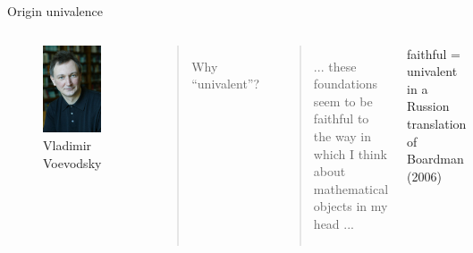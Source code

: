 \documentclass[english,draft]{beamer}
\begin{document}
\begin{frame}{Origin univalence}

\begin{columns}[c]
        \begin{center}
            \begin{figure}[h!]
                \includegraphics[height=.7\textheight]{figures/voevodsky.jpg}
                \caption{Vladimir Voevodsky}
            \end{figure} 
        \end{center}
        \begin{quotation}
            Why ``univalent''?
        \end{quotation}

        \pause

        \begin{quotation}
        ... these foundations seem to be faithful to the way in which I think about mathematical objects in my head ...
        \end{quotation}

        faithful = univalent in a Russion translation of Boardman (2006)

\end{columns}




\end{frame}
\end{document}
